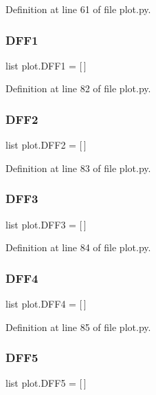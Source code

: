 Definition at line 61 of file plot.\+py.

\mbox{\label{namespaceplot_a30d1cecec51ca6387427ad4b98070d22}} 
\subsubsection{D\+F\+F1}
{\footnotesize\ttfamily list plot.\+D\+F\+F1 = [$\,$]}



Definition at line 82 of file plot.\+py.

\mbox{\label{namespaceplot_ae2e618b6eb4ab9a42219c6e2974b9623}} 
\subsubsection{D\+F\+F2}
{\footnotesize\ttfamily list plot.\+D\+F\+F2 = [$\,$]}



Definition at line 83 of file plot.\+py.

\mbox{\label{namespaceplot_a2eb988aa42590f8cfcc419eaf5249aac}} 
\subsubsection{D\+F\+F3}
{\footnotesize\ttfamily list plot.\+D\+F\+F3 = [$\,$]}



Definition at line 84 of file plot.\+py.

\mbox{\label{namespaceplot_afab5372a4e56f92b7b041595495f1106}} 
\subsubsection{D\+F\+F4}
{\footnotesize\ttfamily list plot.\+D\+F\+F4 = [$\,$]}



Definition at line 85 of file plot.\+py.

\mbox{\label{namespaceplot_ac7e396f11c0329068bae540e54320ba8}} 
\subsubsection{D\+F\+F5}
{\footnotesize\ttfamily list plot.\+D\+F\+F5 = [$\,$]}




